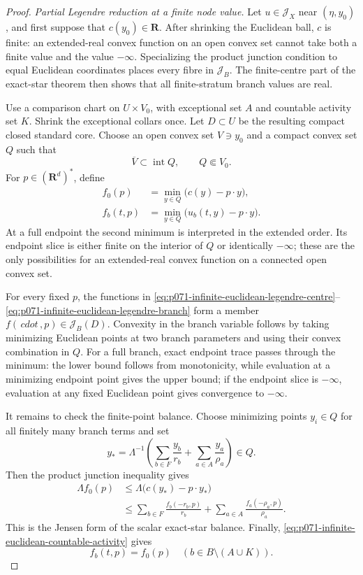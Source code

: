 \begin{proof}
\medskip\noindent
\emph{Partial Legendre reduction at a finite node value.}
Let $u\in\mathcal J_X$ near $(\eta,y_0)$, and first suppose that
$c(y_0)\in\mathbf R$.  After shrinking the Euclidean ball, $c$ is
finite: an extended-real convex function on an open convex set cannot take
both a finite value and the value $-\infty$.  Specializing the product
junction condition to equal Euclidean coordinates places every fibre in
$\mathscr J_B$.  The finite-centre part of the exact-star theorem then
shows that all finite-stratum branch values are real.

Use a comparison chart on $U\times V_0$, with exceptional set $A$ and
countable activity set $K$.  Shrink the exceptional collars once.  Let
$D\subset U$ be the resulting compact closed standard core.  Choose an
open convex set $V\ni y_0$ and a compact convex set $Q$ such that
\[
                  \overline V\subset\operatorname{int}Q,
                  \qquad Q\Subset V_0.
\]
For
$p\in(\mathbf R^d)^*$, define
\begin{align}
 f_0(p)&=\min_{y\in Q}\bigl(c(y)-p\mathbin\cdot y\bigr),
 \label{eq:p071-infinite-euclidean-legendre-centre}\\
 f_b(t,p)&=\min_{y\in Q}
       \bigl(u_b(t,y)-p\mathbin\cdot y\bigr).
 \label{eq:p071-infinite-euclidean-legendre-branch}
\end{align}
At a full endpoint the second minimum is interpreted in the extended
order.  Its endpoint slice is either finite on the interior of $Q$ or
identically $-\infty$; these are the only possibilities for an
extended-real convex function on a connected open convex set.

For every fixed $p$, the functions in
\eqref{eq:p071-infinite-euclidean-legendre-centre}--%
\eqref{eq:p071-infinite-euclidean-legendre-branch} form a member
$f(\,cdot\,,p)\in\mathscr J_B(D)$.  Convexity in the branch variable
follows by taking minimizing Euclidean points at two branch parameters and
using their convex combination in $Q$.  For a full branch, exact endpoint
trace passes through the minimum: the lower bound follows from
monotonicity, while evaluation at a minimizing endpoint point gives the
upper bound; if the endpoint slice is $-\infty$, evaluation at any fixed
Euclidean point gives convergence to $-\infty$.

It remains to check the finite-point balance.  Choose minimizing points
$y_i\in Q$ for all finitely many branch terms and set
\[
 y_*=\Lambda^{-1}
 \left(\sum_{b\in F}\frac{y_b}{r_b}
       +\sum_{a\in A}\frac{y_a}{\rho_a}\right)\in Q.
\]
Then the product junction inequality gives
\begin{align*}
 \Lambda f_0(p)
 &\leq \Lambda\bigl(c(y_*)-p\mathbin\cdot y_*\bigr)\\
 &\leq
 \sum_{b\in F}\frac{f_b(-r_b,p)}{r_b}
 +\sum_{a\in A}\frac{f_a(-\rho_a,p)}{\rho_a}.
\end{align*}
This is the Jensen form of the scalar exact-star balance.  Finally,
\eqref{eq:p071-infinite-euclidean-countable-activity} gives
\begin{equation}
 f_b(t,p)=f_0(p)
 \quad(b\in B\setminus(A\cup K)).
 \label{eq:p071-infinite-euclidean-legendre-inactive}
\end{equation}


\end{proof}
